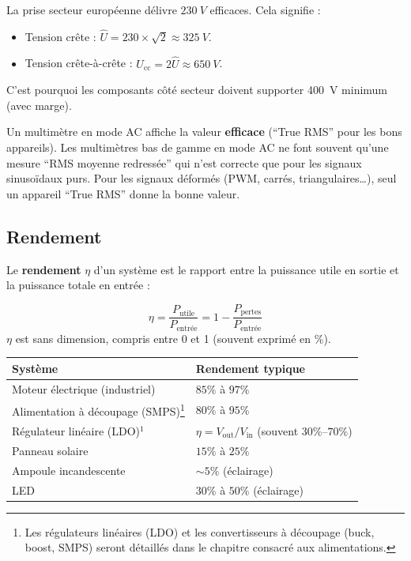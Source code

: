 \documentclass[12pt,a4paper,twoside]{book}
\begin{document}
\begin{pratique}
La prise secteur européenne délivre $\SI{230}{V}$ efficaces. Cela signifie :
\begin{itemize}[nosep]
\item Tension crête : $\hat{U} = 230 \times \sqrt{2} \approx \SI{325}{V}$.
\item Tension crête-à-crête : $U_{\text{cc}} = 2\hat{U} \approx \SI{650}{V}$.
\end{itemize}
C'est pourquoi les composants côté secteur doivent supporter \SI{400}{V} minimum (avec marge).
\end{pratique}

\begin{attention}
Un multimètre en mode AC affiche la valeur \textbf{efficace} (``True RMS'' pour les bons appareils). Les multimètres bas de gamme en mode AC ne font souvent qu'une mesure ``RMS moyenne redressée'' qui n'est correcte que pour les signaux sinusoïdaux purs. Pour les signaux déformés (PWM, carrés, triangulaires\ldots), seul un appareil ``True RMS'' donne la bonne valeur.
\end{attention}

\subsection{Rendement}

Le \textbf{rendement} $\eta$ d'un système est le rapport entre la puissance utile en sortie et la puissance totale en entrée :

\begin{formule}
\[
\boxed{\eta = \frac{P_{\text{utile}}}{P_{\text{entrée}}} = 1 - \frac{P_{\text{pertes}}}{P_{\text{entrée}}}}
\]
$\eta$ est sans dimension, compris entre 0 et 1 (souvent exprimé en \%).
\end{formule}

\begin{center}
\begin{tabular}{ll}
\toprule
\textbf{Système} & \textbf{Rendement typique} \\
\midrule
Moteur électrique (industriel) & $85\%$ à $97\%$ \\
Alimentation à découpage (SMPS)\footnote{Les régulateurs linéaires (LDO) et les convertisseurs à découpage (buck, boost, SMPS) seront détaillés dans le chapitre consacré aux alimentations.} & $80\%$ à $95\%$ \\
Régulateur linéaire (LDO)$^\text{1}$ & $\eta = V_{\text{out}}/V_{\text{in}}$ (souvent $30\%$--$70\%$) \\
Panneau solaire & $15\%$ à $25\%$ \\
Ampoule incandescente & $\sim 5\%$ (éclairage) \\
LED & $30\%$ à $50\%$ (éclairage) \\
\bottomrule
\end{tabular}
\end{center}
\end{document}
